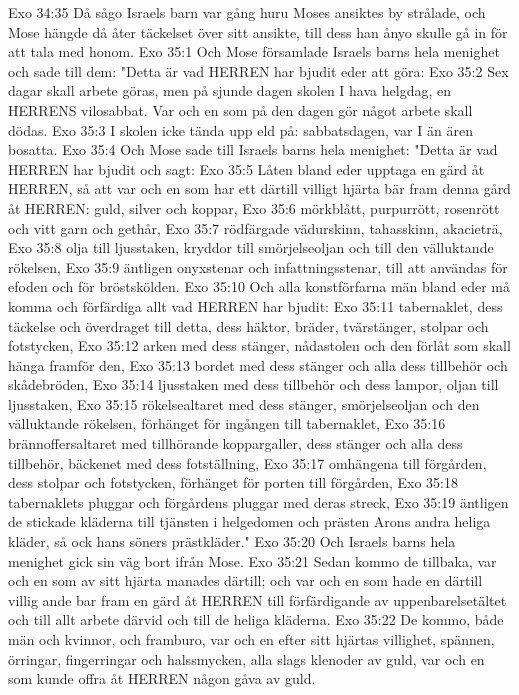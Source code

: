 Exo 34:35  Då sågo Israels barn var gång huru Moses ansiktes by strålade, och Mose hängde då åter täckelset över sitt ansikte, till dess han ånyo skulle gå in för att tala med honom.
Exo 35:1  Och Mose församlade Israels barns hela menighet och sade till dem: "Detta är vad HERREN har bjudit eder att göra:
Exo 35:2  Sex dagar skall arbete göras, men på sjunde dagen skolen I hava helgdag, en HERRENS vilosabbat. Var och en som på den dagen gör något arbete skall dödas.
Exo 35:3  I skolen icke tända upp eld på: sabbatsdagen, var I än ären bosatta.
Exo 35:4  Och Mose sade till Israels barns hela menighet: "Detta är vad HERREN har bjudit och sagt:
Exo 35:5  Låten bland eder upptaga en gärd åt HERREN, så att var och en som har ett därtill villigt hjärta bär fram denna gård åt HERREN: guld, silver och koppar,
Exo 35:6  mörkblått, purpurrött, rosenrött och vitt garn och gethår,
Exo 35:7  rödfärgade vädurskinn, tahasskinn, akacieträ,
Exo 35:8  olja till ljusstaken, kryddor till smörjelseoljan och till den välluktande rökelsen,
Exo 35:9  äntligen onyxstenar och infattningsstenar, till att användas för efoden och för bröstskölden.
Exo 35:10  Och alla konstförfarna män bland eder må komma och förfärdiga allt vad HERREN har bjudit:
Exo 35:11  tabernaklet, dess täckelse och överdraget till detta, dess häktor, bräder, tvärstänger, stolpar och fotstycken,
Exo 35:12  arken med dess stänger, nådastolen och den förlåt som skall hänga framför den,
Exo 35:13  bordet med dess stänger och alla dess tillbehör och skådebröden,
Exo 35:14  ljusstaken med dess tillbehör och dess lampor, oljan till ljusstaken,
Exo 35:15  rökelsealtaret med dess stänger, smörjelseoljan och den välluktande rökelsen, förhänget för ingången till tabernaklet,
Exo 35:16  brännoffersaltaret med tillhörande koppargaller, dess stänger och alla dess tillbehör, bäckenet med dess fotställning,
Exo 35:17  omhängena till förgården, dess stolpar och fotstycken, förhänget för porten till förgården,
Exo 35:18  tabernaklets pluggar och förgårdens pluggar med deras streck,
Exo 35:19  äntligen de stickade kläderna till tjänsten i helgedomen och prästen Arons andra heliga kläder, så ock hans söners prästkläder."
Exo 35:20  Och Israels barns hela menighet gick sin väg bort ifrån Mose.
Exo 35:21  Sedan kommo de tillbaka, var och en som av sitt hjärta manades därtill; och var och en som hade en därtill villig ande bar fram en gärd åt HERREN till förfärdigande av uppenbarelsetältet och till allt arbete därvid och till de heliga kläderna.
Exo 35:22  De kommo, både män och kvinnor, och framburo, var och en efter sitt hjärtas villighet, spännen, örringar, fingerringar och halssmycken, alla slags klenoder av guld, var och en som kunde offra åt HERREN någon gåva av guld.
